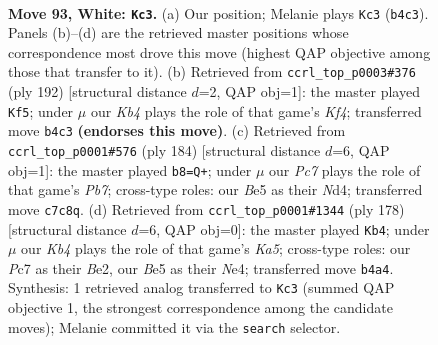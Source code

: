 \documentclass[11pt]{article}
\begin{document}
\clearpage

\begin{figure}[p]\centering
\begin{subfigure}{0.46\textwidth}\centering
\resizebox{\linewidth}{!}{%
\newchessgame
\chessboard[
  setfen={5k2/2P5/8/4B3/1K6/8/8/8 w - - 11 93},
  showmover=false,
  pgfstyle=straightmove, color=movearrow, markmove={b4-c3}
]}
\caption{}
\end{subfigure}\hfill
\begin{subfigure}{0.46\textwidth}\centering
\resizebox{\linewidth}{!}{%
\newchessgame
\chessboard[
  setfen={6k1/8/6P1/8/5K2/3B4/8/8 w - - 3 97},
  showmover=false,
  pgfstyle=straightmove, color=movearrow, markmove={f4-f5}
]}
\caption{}
\end{subfigure}
\\[4pt]
\begin{subfigure}{0.46\textwidth}\centering
\resizebox{\linewidth}{!}{%
\newchessgame
\chessboard[
  setfen={8/KP6/3k4/8/3N4/8/8/8 w - - 3 93},
  showmover=false,
  pgfstyle=straightmove, color=movearrow, markmove={b7-b8}
]}
\caption{}
\end{subfigure}\hfill
\begin{subfigure}{0.46\textwidth}\centering
\resizebox{\linewidth}{!}{%
\newchessgame
\chessboard[
  setfen={8/8/8/K7/4N3/8/1k2B3/8 w - - 6 90},
  showmover=false,
  pgfstyle=straightmove, color=movearrow, markmove={a5-b4}
]}
\caption{}
\end{subfigure}
\caption{\textbf{Move 93, White: \texttt{Kc3}.} (a) Our position; Melanie plays \texttt{Kc3} (\texttt{b4c3}). Panels (b)--(d) are the retrieved master positions whose correspondence most drove this move (highest QAP objective among those that transfer to it). (b) Retrieved from \texttt{ccrl\_top\_p0003\#376} (ply 192) [structural distance $d$=2, QAP obj=1]: the master played \texttt{Kf5}; under $\mu$ our \emph{Kb4} plays the role of that game's \emph{Kf4}; transferred move \texttt{b4c3} \textbf{(endorses this move)}. (c) Retrieved from \texttt{ccrl\_top\_p0001\#576} (ply 184) [structural distance $d$=6, QAP obj=1]: the master played \texttt{b8=Q+}; under $\mu$ our \emph{Pc7} plays the role of that game's \emph{Pb7}; cross-type roles: our \emph{B}e5 as their \emph{N}d4; transferred move \texttt{c7c8q}. (d) Retrieved from \texttt{ccrl\_top\_p0001\#1344} (ply 178) [structural distance $d$=6, QAP obj=0]: the master played \texttt{Kb4}; under $\mu$ our \emph{Kb4} plays the role of that game's \emph{Ka5}; cross-type roles: our \emph{P}c7 as their \emph{B}e2, our \emph{B}e5 as their \emph{N}e4; transferred move \texttt{b4a4}. Synthesis: 1 retrieved analog transferred to \texttt{Kc3} (summed QAP objective 1, the strongest correspondence among the candidate moves); Melanie committed it via the \texttt{search} selector.}
\label{fig:thought-m184}
\end{figure}
\end{document}
